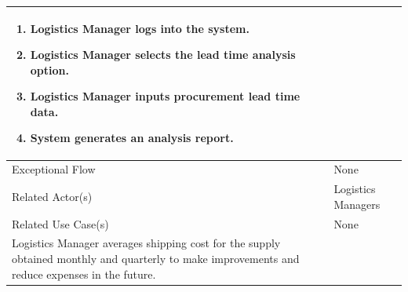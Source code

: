 \begin{center}
\begin{tabularx}{\textwidth}{|l|X|}
\begin{enumerate}[left=0pt]
			\item Logistics Manager logs into the system.
			\item Logistics Manager selects the lead time analysis option.
			\item Logistics Manager inputs procurement lead time data.
			\item System generates an analysis report.
		\end{enumerate} \\
		\hline
		Exceptional Flow & None \\
		\hline
		Related Actor(s) & Logistics Managers \\
		\hline
		Related Use Case(s) & None \\
		\hline
		Logistics Manager averages shipping cost for the supply obtained monthly and quarterly to make improvements and reduce expenses in the future. \\
		\hline
	\end{tabularx}
\end{center}


